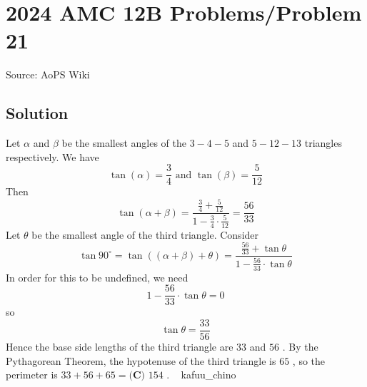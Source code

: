 \documentclass[12pt]{article}
\begin{document}
\section*{{2024 AMC 12B Problems/Problem 21}}
Source: AoPS Wiki

\subsection*{Solution}
Let $\alpha$ and $\beta$ be the smallest angles of the $3-4-5$ and $5-12-13$ triangles respectively. We have \[\tan(\alpha)=\frac{3}{4} \text{ and } \tan(\beta)=\frac{5}{12}\] Then \[\tan(\alpha+\beta)=\frac{\frac{3}{4}+\frac{5}{12}}{1-\frac{3}{4}\cdot\frac{5}{12}}=\frac{56}{33}\] Let $\theta$ be the smallest angle of the third triangle. Consider \[\tan{90^\circ}=\tan((\alpha+\beta)+\theta)=\frac{\frac{56}{33}+\tan{\theta}}{1-\frac{56}{33}\cdot\tan{\theta}}\] In order for this to be undefined, we need \[1-\frac{56}{33}\cdot\tan{\theta}=0\] so \[\tan{\theta}=\frac{33}{56}\] Hence the base side lengths of the third triangle are $33$ and $56$ . By the Pythagorean Theorem, the hypotenuse of the third triangle is $65$ , so the perimeter is $33+56+65=\boxed{\textbf{(C) }154}$ . ~ kafuu_chino
\end{document}
